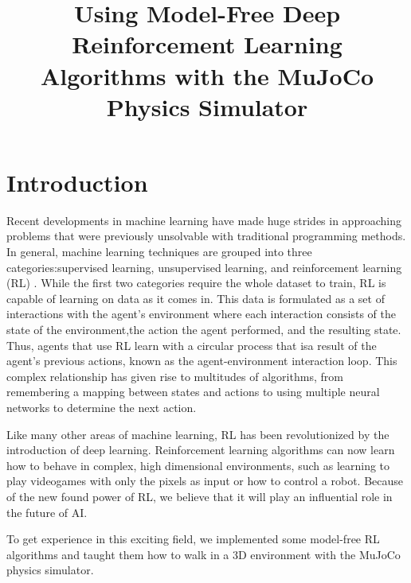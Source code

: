 \documentclass[conference]{IEEEtran}
\begin{document}
\title{Using Model-Free Deep Reinforcement Learning Algorithms with the MuJoCo Physics Simulator}

\author{
    \and
}
\maketitle

\begin{abstract}
    \blindtext
\end{abstract}

\section{Introduction}

Recent developments in machine learning have made huge strides in approaching problems that were previously unsolvable with traditional programming methods. In general, machine learning techniques are grouped into three categories:supervised learning, unsupervised learning, and reinforcement learning (RL) \cite{rl_application}. While the first two categories require the whole dataset to train, RL is capable of learning on data as it comes in. This data is formulated as a set of interactions with the agent's environment where each interaction consists of the state of the environment,the action the agent performed, and the resulting state. Thus, agents that use RL learn with a circular process that isa result of the agent's previous actions, known as the agent-environment interaction loop. This complex relationship has given rise to multitudes of algorithms, from remembering a mapping between states and actions to using multiple neural networks to determine the next action.

Like many other areas of machine learning, RL has been revolutionized by the introduction of deep learning. Reinforcement learning algorithms can now learn how to behave in complex, high dimensional environments, such as learning to play videogames with only the pixels as input or how to control a robot. Because of the new found power of RL, we believe that it will play an influential role in the future of AI.

To get experience in this exciting field, we implemented some model-free RL algorithms and taught them how to walk in a 3D environment with the MuJoCo physics simulator.
\end{document}
